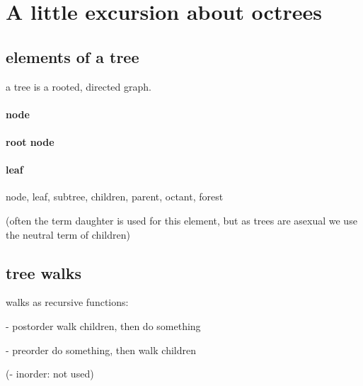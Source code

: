 
\section{A little excursion about octrees}

\subsection{elements of a tree}
a tree is a rooted, directed graph.

\paragraph{node}

\paragraph{root node}

\paragraph{leaf}
node, leaf, subtree, children, parent, octant, forest

(often the term daughter is used for this element, but as trees are asexual we use the neutral term of children)

\subsection{tree walks}

walks as recursive functions:

- postorder
walk children, then do something

- preorder
do something, then walk children

(- inorder:
not used)